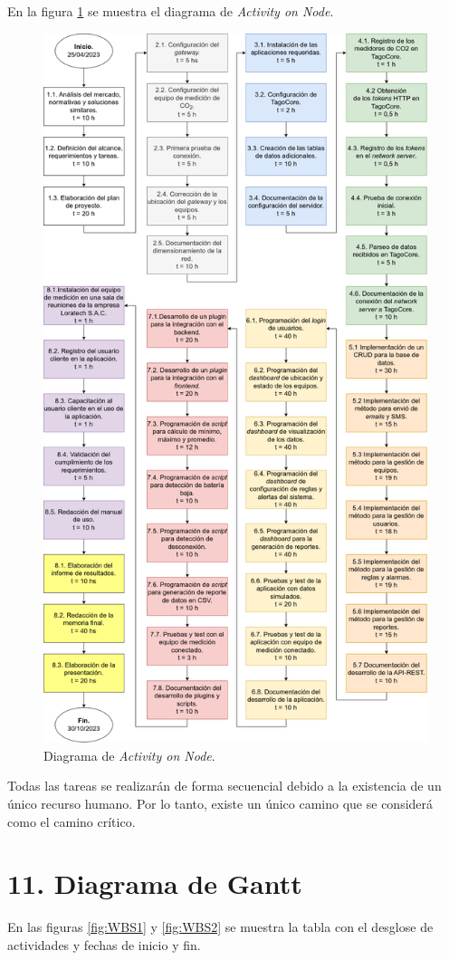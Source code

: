 \documentclass[
11pt, %
]{charter}
\begin{document}
En la figura \ref{fig:AoN} se muestra el diagrama de \textit{Activity on Node}.
\begin{figure}[htpb]
\centering 
\includegraphics[width=.81\textwidth]{./Figuras/AoN.png}
\caption{Diagrama de \textit{Activity on Node}.}
\label{fig:AoN}
\end{figure}


\newpage
Todas las tareas se realizarán de forma secuencial debido a la existencia de un único recurso humano. Por lo tanto, existe un único camino que se considerá como el camino crítico.
\section{11. Diagrama de Gantt}
\label{sec:gantt}
En las figuras \ref{fig:WBS1} y \ref{fig:WBS2} se muestra la tabla con el desglose de actividades y fechas de inicio y fin.
\end{document}
